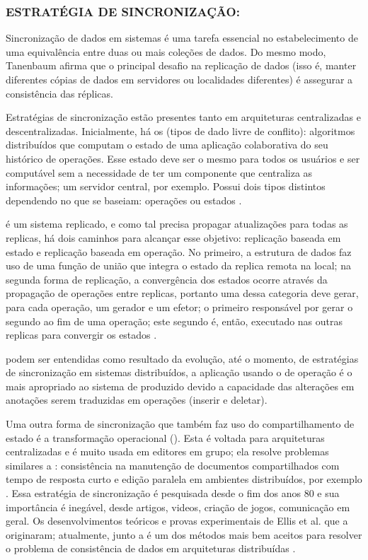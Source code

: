 \subsubsection{ESTRATÉGIA DE SINCRONIZAÇÃO: }

Sincronização de dados em sistemas é uma tarefa essencial no estabelecimento de uma equivalência entre duas ou mais coleções de dados. Do mesmo modo, Tanenbaum \cite{tanenbaum2007dist} afirma que o principal desafio na replicação de dados (isso é, manter diferentes cópias de dados em servidores ou localidades diferentes) é assegurar a consistência das réplicas. 

Estratégias de sincronização estão presentes tanto em arquiteturas centralizadas e descentralizadas. Inicialmente, há os  (tipos de dado livre de conflito): algoritmos distribuídos que computam o estado de uma aplicação colaborativa do seu histórico de operações. Esse estado deve ser o mesmo para todos os usuários e ser computável sem a necessidade de ter um componente que centraliza as informações; um servidor central, por exemplo. Possui dois tipos distintos dependendo no que se baseiam: operações ou estados \cite{weidner2023crdtsurvey}.

 é um sistema replicado, e como tal precisa propagar atualizações para todas as replicas, há dois caminhos para alcançar esse objetivo: replicação baseada em estado e replicação baseada em operação. No primeiro, a estrutura de dados faz uso de uma função de união que integra o estado da replica remota na local; na segunda forma de replicação, a convergência dos estados ocorre através da propagação de operações entre replicas, portanto uma  dessa categoria deve gerar, para cada operação, um gerador e um efetor; o primeiro responsável por gerar o segundo ao fim de uma operação; este segundo é, então, executado nas outras replicas para convergir os estados \cite{PreguicaBaqueroShapiro2018CRDT}.

 podem ser entendidas como resultado da evolução, até o momento, de estratégias de sincronização em sistemas distribuídos, a aplicação usando o  de operação é o mais apropriado ao sistema de  produzido devido a capacidade das alterações em anotações serem traduzidas em operações (inserir e deletar).

Uma outra forma de sincronização que também faz uso do compartilhamento de estado é a transformação operacional (). Esta é voltada para arquiteturas centralizadas e é muito usada em editores em grupo; ela resolve problemas similares a : consistência na manutenção de documentos compartilhados com tempo de resposta curto e edição paralela em ambientes distribuídos, por exemplo \cite{SunEllis1998OperationalTransformation}. Essa estratégia de sincronização é pesquisada desde o fim dos anos 80 e sua importância é inegável, desde artigos, videos, criação de jogos, comunicação  em geral. Os desenvolvimentos teóricos e provas experimentais de Ellis et al. que a originaram; atualmente, junto a  é um dos métodos mais bem aceitos para resolver o problema de consistência de dados em arquiteturas distribuídas \cite{GadeaIonescuIonescu2020ControlLoopOT}.
